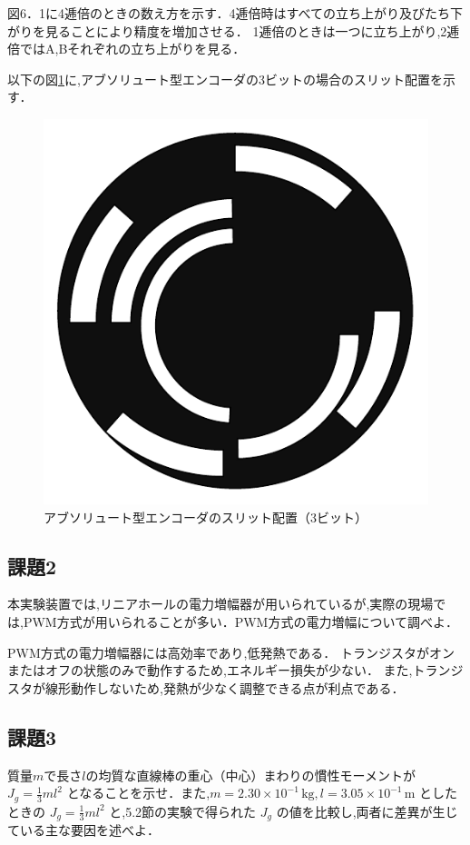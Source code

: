 図6．1に4逓倍のときの数え方を示す．4逓倍時はすべての立ち上がり及びたち下がりを見ることにより精度を増加させる．
1逓倍のときは一つに立ち上がり,2逓倍ではA,Bそれぞれの立ち上がりを見る．

以下の図\ref{fig:abs_encoder}に,アブソリュート型エンコーダの3ビットの場合のスリット配置を示す．
\begin{figure}[h]
  \centering
  \includegraphics[scale=0.5]{sozai/10.pdf}
  \caption{アブソリュート型エンコーダのスリット配置（3ビット）}
  \label{fig:abs_encoder}
\end{figure}



\subsection*{課題2}
本実験装置では,リニアホールの電力増幅器が用いられているが,実際の現場では,PWM方式が用いられることが多い．PWM方式の電力増幅について調べよ．

PWM方式の電力増幅器には高効率であり,低発熱である．
トランジスタがオンまたはオフの状態のみで動作するため,エネルギー損失が少ない．
また,トランジスタが線形動作しないため,発熱が少なく調整できる点が利点である．


\subsection*{課題3}
質量$m$で長さ$l$の均質な直線棒の重心（中心）まわりの慣性モーメントが $J_g = \frac{1}{3}ml^2$ となることを示せ．また,$m = 2.30 \times 10^{-1} \, \mathrm{kg}, l = 3.05 \times 10^{-1} \, \mathrm{m}$ としたときの $J_g = \frac{1}{3}ml^2$ と,5.2節の実験で得られた $J_g$ の値を比較し,両者に差異が生じている主な要因を述べよ．


